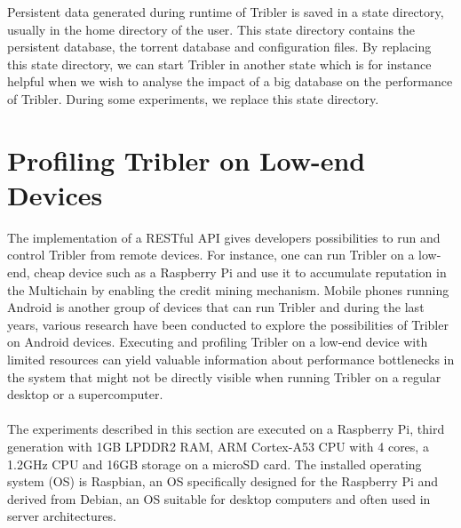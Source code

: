 Persistent data generated during runtime of Tribler is saved in a state directory, usually in the home directory of the user. This state directory contains the persistent database, the torrent database and configuration files. By replacing this state directory, we can start Tribler in another state which is for instance helpful when we wish to analyse the impact of a big database on the performance of Tribler. During some experiments, we replace this state directory.

\section{Profiling Tribler on Low-end Devices}
\label{sec:profiling_tribler_lowend}
The implementation of a RESTful API gives developers possibilities to run and control Tribler from remote devices. For instance, one can run Tribler on a low-end, cheap device such as a Raspberry Pi and use it to accumulate reputation in the Multichain by enabling the credit mining mechanism. Mobile phones running Android is another group of devices that can run Tribler and during the last years, various research have been conducted to explore the possibilities of Tribler on Android devices\cite{sabee2014tribler}\cite{de2014android}. Executing and profiling Tribler on a low-end device with limited resources can yield valuable information about performance bottlenecks in the system that might not be directly visible when running Tribler on a regular desktop or a supercomputer.\\\\
The experiments described in this section are executed on a Raspberry Pi, third generation with 1GB LPDDR2 RAM, ARM Cortex-A53 CPU with 4 cores, a 1.2GHz CPU and 16GB storage on a microSD card. The installed operating system (OS) is Raspbian, an OS specifically designed for the Raspberry Pi and derived from Debian, an OS suitable for desktop computers and often used in server architectures.\\\\

